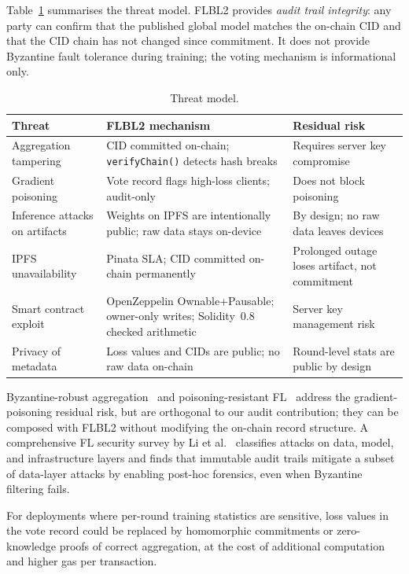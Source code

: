 \documentclass{llncs}
\begin{document}
Table~\ref{tab:threats} summarises the threat model. FLBL2 provides
\emph{audit trail integrity}: any party can confirm that the published
global model matches the on-chain CID and that the CID chain has not
changed since commitment. It does not provide Byzantine fault tolerance
during training; the voting mechanism is informational only.

\begin{table}[h]
\caption{Threat model.}
\label{tab:threats}
\centering\footnotesize
\setlength{\tabcolsep}{3pt}
\begin{tabular}{p{2.8cm}p{3.8cm}p{3.4cm}}
\toprule
\textbf{Threat} & \textbf{FLBL2 mechanism} & \textbf{Residual risk} \\
\midrule
Aggregation tampering &
  CID committed on-chain; \texttt{verifyChain()} detects hash breaks &
  Requires server key compromise \\
Gradient poisoning~\cite{blanchard2017machine,fang2020local} &
  Vote record flags high-loss clients; audit-only &
  Does not block poisoning \\
Inference attacks on artifacts &
  Weights on IPFS are intentionally public; raw data stays on-device &
  By design; no raw data leaves devices \\
IPFS unavailability &
  Pinata SLA; CID committed on-chain permanently &
  Prolonged outage loses artifact, not commitment \\
Smart contract exploit &
  OpenZeppelin Ownable+Pausable; owner-only writes; Solidity~0.8 checked arithmetic &
  Server key management risk \\
Privacy of metadata &
  Loss values and CIDs are public; no raw data on-chain &
  Round-level stats are public by design \\
\bottomrule
\end{tabular}
\end{table}

Byzantine-robust aggregation~\cite{blanchard2017machine} and
poisoning-resistant FL~\cite{fang2020local,dong2024defending} address the
gradient-poisoning residual risk, but are orthogonal to our audit
contribution; they can be composed with FLBL2 without modifying the
on-chain record structure. A comprehensive FL security survey by Li et
al.~\cite{li2023security} classifies attacks on data, model, and
infrastructure layers and finds that immutable audit trails mitigate a
subset of data-layer attacks by enabling post-hoc forensics, even when
Byzantine filtering fails.

For deployments where per-round training statistics are sensitive, loss
values in the vote record could be replaced by homomorphic commitments or
zero-knowledge proofs of correct aggregation, at the cost of additional
computation and higher gas per transaction.
\end{document}
